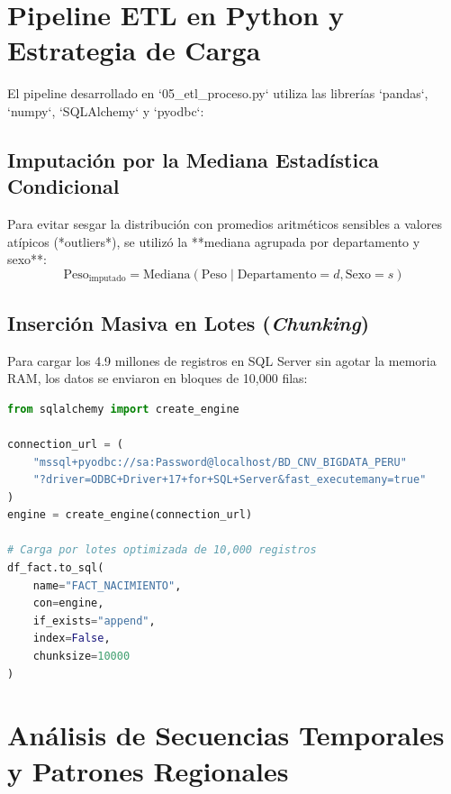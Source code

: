 \documentclass[12pt,a4paper]{article}
\begin{document}
\newpage

\section{Pipeline ETL en Python y Estrategia de Carga}

El pipeline desarrollado en `05_etl_proceso.py` utiliza las librerías `pandas`, `numpy`, `SQLAlchemy` y `pyodbc`:

\subsection{Imputación por la Mediana Estadística Condicional}
Para evitar sesgar la distribución con promedios aritméticos sensibles a valores atípicos (*outliers*), se utilizó la **mediana agrupada por departamento y sexo**:
$$\text{Peso}_{\text{imputado}} = \text{Mediana}(\text{Peso} \mid \text{Departamento} = d, \text{Sexo} = s)$$

\subsection{Inserción Masiva en Lotes (\textit{Chunking})}
Para cargar los 4.9 millones de registros en SQL Server sin agotar la memoria RAM, los datos se enviaron en bloques de 10,000 filas:

\begin{lstlisting}[language=Python]
from sqlalchemy import create_engine

connection_url = (
    "mssql+pyodbc://sa:Password@localhost/BD_CNV_BIGDATA_PERU"
    "?driver=ODBC+Driver+17+for+SQL+Server&fast_executemany=true"
)
engine = create_engine(connection_url)

# Carga por lotes optimizada de 10,000 registros
df_fact.to_sql(
    name="FACT_NACIMIENTO", 
    con=engine, 
    if_exists="append", 
    index=False, 
    chunksize=10000
)
\end{lstlisting}

\newpage

\section{Análisis de Secuencias Temporales y Patrones Regionales}
\end{document}
